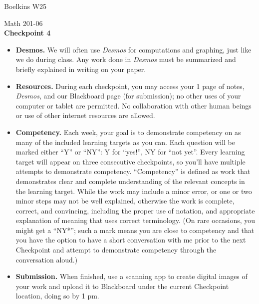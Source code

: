 \documentclass[11 pt]{article}
\begin{document}
 \hfill Boelkins  W25\\
 
\begin{center}
Math 201-06 \\
{\bf Checkpoint 4}
\end{center}



\begin{itemize}
	
	\item {\bf Desmos.} We will often use \emph{Desmos} for computations and graphing, just like we do during class.  Any work done in \emph{Desmos} must be summarized and briefly explained in writing on your paper.  
	
	\item {\bf Resources.} During each checkpoint, you may access your 1 page of notes, \emph{Desmos}, and our Blackboard page (for submission); no other uses of your computer or tablet are permitted.  No collaboration with other human beings or use of other internet resources are allowed.
	
	\item {\bf Competency.} Each week, your goal is to demonstrate competency on as many of the included learning targets as you can.  Each question will be marked either ``Y'' or ``NY'': Y for ``yes!'', NY for ``not yet''.  Every learning target will appear on three consecutive checkpoints, so you'll have multiple attempts to demonstrate competency.  ``Competency'' is defined as work that demonstrates clear and complete understanding of the relevant concepts in the learning target. While the work may include a minor error, or one or two minor steps may not be well explained, otherwise the work is complete, correct, and convincing, including the proper use of notation, and appropriate explanation of meaning that uses correct terminology.  (On rare occasions, you might get a ``NY*''; such a mark means you are close to competency and that you have the option to have a short conversation with me prior to the next Checkpoint and attempt to demonstrate competency through the conversation aloud.)	
	
	\item {\bf Submission.}  When finished, use a scanning app to create digital images of your work and upload it to Blackboard under the current Checkpoint location, doing so by 1 pm.
	
\end{itemize}
\end{document}
